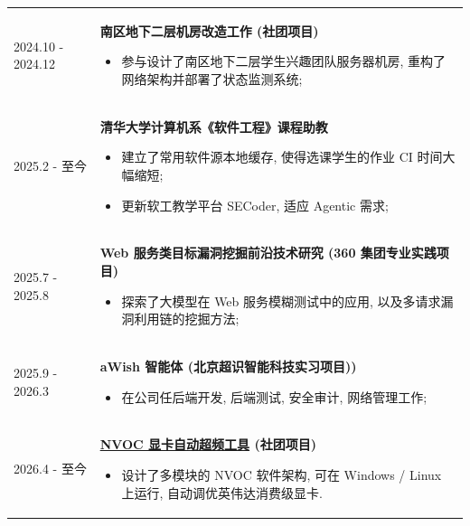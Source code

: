 \documentclass[a4paper, 10pt]{article}
\begin{document}
\begin{tabular}{p{}p{}}
    2024.10 - 2024.12 & \textbf{南区地下二层机房改造工作 (社团项目)}
        \fontsize{8pt}{10pt}\selectfont \begin{itemize}[left=0pt,topsep=0pt,partopsep=0pt,parsep=0pt,itemsep=0pt]
            \item 参与设计了南区地下二层学生兴趣团队服务器机房, 重构了网络架构并部署了状态监测系统;
        \end{itemize} \\
    
    2025.2 - 至今 & \textbf{清华大学计算机系《软件工程》课程助教}
        \fontsize{8pt}{10pt}\selectfont \begin{itemize}[left=0pt,topsep=0pt,partopsep=0pt,parsep=0pt,itemsep=0pt]
            \item 建立了常用软件源本地缓存, 使得选课学生的作业 CI 时间大幅缩短;
            \item 更新软工教学平台 SECoder, 适应 Agentic 需求;
        \end{itemize} \\
    
    2025.7 - 2025.8 & \textbf{Web 服务类目标漏洞挖掘前沿技术研究 (360 集团专业实践项目)}
        \fontsize{8pt}{10pt}\selectfont \begin{itemize}[left=0pt,topsep=0pt,partopsep=0pt,parsep=0pt,itemsep=0pt]
            \item 探索了大模型在 Web 服务模糊测试中的应用, 以及多请求漏洞利用链的挖掘方法;
        \end{itemize} \\
        
    2025.9 - 2026.3 & \textbf{aWish 智能体 (北京超识智能科技实习项目))}
        \fontsize{8pt}{10pt}\selectfont \begin{itemize}[left=0pt,topsep=0pt,partopsep=0pt,parsep=0pt,itemsep=0pt]
        \item 在公司任后端开发, 后端测试, 安全审计, 网络管理工作;
        \end{itemize} \\

    2026.4 - 至今 & \textbf{\href{https://github.com/Skyworks-Neo/nvoc}{NVOC 显卡自动超频工具} (社团项目)}
       \fontsize{8pt}{10pt}\selectfont \begin{itemize}[left=0pt,topsep=0pt,partopsep=0pt,parsep=0pt,itemsep=0pt]
       	\item  设计了多模块的 NVOC 软件架构, 可在 Windows / Linux 上运行, 自动调优英伟达消费级显卡.
       \end{itemize} \\
    
\end{tabular}
\end{document}
